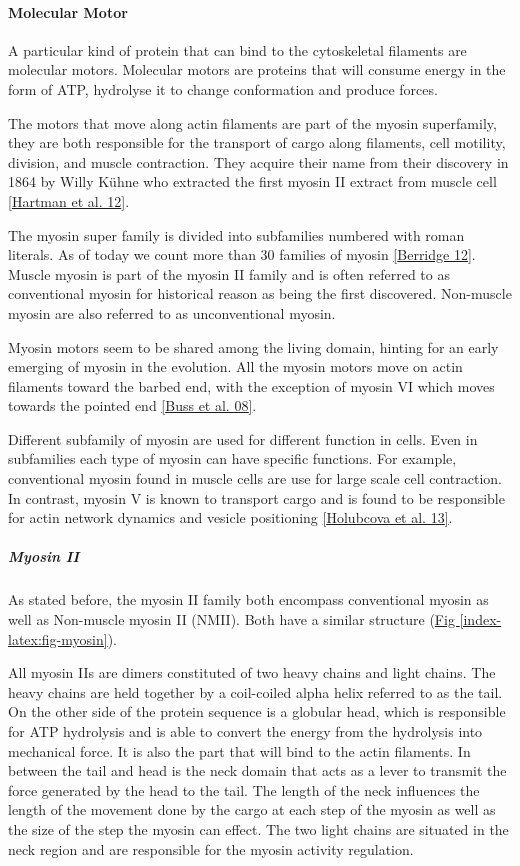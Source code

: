 \documentclass[A4paperpaper,11pt,english]{sphinxmanual}
\begin{document}
\paragraph{Molecular Motor}
\label{index-latex:molecular-motor}
A particular kind of protein that can bind to the cytoskeletal filaments are
molecular motors. Molecular motors are proteins that will consume energy
in the form of ATP, hydrolyse it to change conformation and produce forces.

The motors that move along actin filaments are part of the myosin superfamily, they
are both responsible for the transport of cargo along filaments, cell motility,
division, and muscle contraction. They acquire their name from their discovery
in 1864 by Willy Kühne who extracted the first myosin II extract from muscle
cell {\hyperref[index-latex:hartman2012]{{[}Hartman et al. 12{]}}}.

The myosin super family is divided into subfamilies numbered with roman literals.
As of today we count more than 30 families of myosin {\hyperref[index-latex:berridge2012a]{{[}Berridge 12{]}}}.
Muscle myosin is part of the myosin II family and is often referred to  as
conventional myosin for historical reason as being the first discovered.
Non-muscle  myosin are also referred to as unconventional myosin.

Myosin motors seem to be shared among the living domain, hinting for an
early emerging of myosin in the evolution. All the myosin motors move on actin
filaments toward the barbed end, with the exception of myosin VI which moves
towards the pointed end {\hyperref[index-latex:buss2008]{{[}Buss et al. 08{]}}}.

Different subfamily of myosin are used for different function in cells. Even in
subfamilies each type of myosin can have specific functions. For example,
conventional myosin found in muscle cells are use for large scale cell
contraction. In contrast, myosin V is known to transport cargo and is found to
be responsible for actin network dynamics and vesicle positioning
{\hyperref[index-latex:holubcova2013]{{[}Holubcova et al. 13{]}}}.


\subparagraph{Myosin II}
\label{index-latex:myosin-ii}\label{index-latex:myoii}
As stated before, the myosin II family both encompass conventional myosin as
well as Non-muscle myosin II (NMII). Both have a similar structure (\hyperref[index-latex:fig-myosin]{Fig  \ref*{index-latex:fig-myosin}}).

All myosin IIs are dimers constituted of two heavy chains and light chains. The
heavy chains are held together by a coil-coiled alpha helix referred to as the
tail. On the other side of the protein sequence is a globular head, which is
responsible for ATP hydrolysis and is able to convert the energy from the
hydrolysis into mechanical force. It is also the part that will bind to the
actin filaments. In between the tail and head is the neck domain that acts as a
lever to transmit the force generated by the head to the tail. The length of
the neck influences the length of the movement done by the cargo at each step of
the myosin as well as the size of the step the myosin can effect. The two light
chains are situated in the neck region and are responsible for the myosin
activity regulation.
\end{document}
